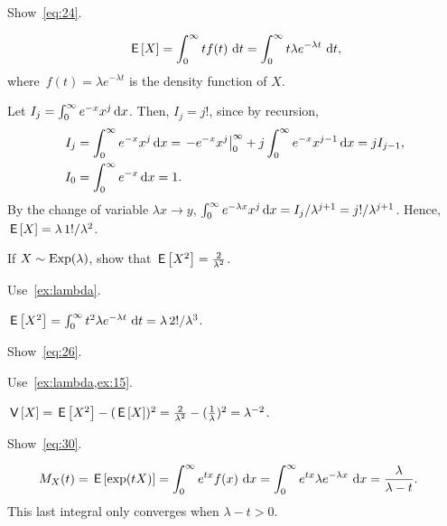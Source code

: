 \begin{exercise}\label{ex:lambda}
Show~\cref{eq:24}.
\begin{hint}
 \begin{equation*}
 \,\mathsf{E}\left[X\right] = \int_0^\infty t f(t)\, \,\textrm{d}t =
 \int_0^\infty t \lambda e^{-\lambda t}\, \,\textrm{d}t,
 \end{equation*}
 where~$f(t)=\lambda e^{-\lambda t}$ is the density function of $X$. 
\end{hint}
\begin{solution}
Let $I_j = \int_0^\infty e^{- x} x^j \,\textrm{d}x$. Then, $I_j = {j!}$, since by recursion,
\begin{align*}
I_j &=  \int_0^\infty e^{- x} x^j \,\textrm{d}x = \left. -e^{-x} x^j\right|_0^\infty + j  \int_0^\infty e^{- x} x^{j-1} \,\textrm{d}x = j I_{j-1}, \\
I_0 &= \int_0^\infty e^{-x} \,\textrm{d}x = 1.
\end{align*}
By the change of variable $\lambda x \to y$, $\int_0^\infty e^{- \lambda x} x^j \,\textrm{d}x = I_j/\lambda^{j+1} = j!/\lambda^{j+1}$. 
Hence, $\,\mathsf{E}\left[X\right] = \lambda\, 1!/\lambda^2$.
\end{solution}
\end{exercise}

\begin{exercise}\label{ex:15}  
 If 
 $X\sim\operatorname{Exp}(\lambda)$, show that $\,\mathsf{E}\left[X^2\right] = \frac{2}{\lambda^2}$.
\begin{hint}
Use~\cref{ex:lambda}.
\end{hint}
\begin{solution}
$\,\mathsf{E}\left[X^2\right] =  \int_0^\infty t^2  \lambda e^{-\lambda t}\, \,\textrm{d}t = \lambda\, 2!/\lambda^3$.
\end{solution}
\end{exercise}


\begin{exercise}\label{ex:86}
Show~\cref{eq:26}.
\begin{hint} Use~\cref{ex:lambda,ex:15}. 
\end{hint}
\begin{solution}
$\,\mathsf{V}\left[X\right] = \,\mathsf{E}\left[X^2\right] - (\,\mathsf{E}\left[X\right])^2 = \frac{2}{\lambda^2} - (\frac{1}{\lambda})^2 = \lambda^{-2}$.
\end{solution}
\end{exercise}


\begin{exercise}\label{ex:11}
Show~\cref{eq:30}.
\begin{solution}
 \begin{align*}
 M_X(t) &= \,\mathsf{E}\left[\exp(t X)\right] 
=\int_0^\infty e^{tx} f(x) \,\,\textrm{d}x 
=\int_0^\infty e^{tx} \lambda e^{-\lambda x} \,\,\textrm{d}x =\frac{\lambda}{\lambda -t}.
 \end{align*}
This last integral only converges when $\lambda -t > 0$. 
\end{solution}
\end{exercise}


